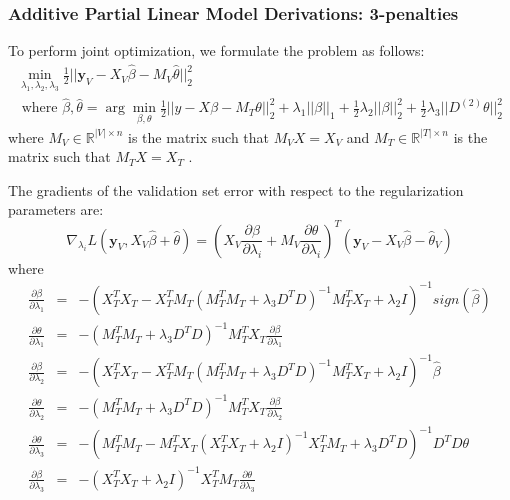 \documentclass[10pt,letterpaper]{article}
\begin{document}
\subsubsection{Additive Partial Linear Model Derivations: 3-penalties}

To perform joint optimization, we formulate the problem as follows:
\begin{multline}
\min_{\lambda_1, \lambda_2, \lambda_3} \frac{1}{2} \bigl\lvert\bigl\lvert \boldsymbol y_V - X_V\hat\beta - M_V \hat\theta \bigl\rvert\bigl\rvert^2_2 \\
\text{ where } \hat\beta, \hat\theta = \arg\min_{\beta, \theta} \frac{1}{2} \bigl\lvert\bigl\lvert y - X\beta - M_T \theta \bigl\rvert\bigl\rvert^2_2
+ \lambda_1 \lvert\lvert \beta \rvert \rvert_1
+ \frac{1}{2} \lambda_2 \lvert\lvert \beta \rvert \rvert_2^2
+ \frac{1}{2} \lambda_3 \lvert\lvert D^{(2)} \theta \rvert \rvert_2^2
\end{multline}
where $M_V \in \mathbb{R}^{|V| \times n}$ is the matrix such that $M_V X = X_V$ and $M_T \in \mathbb{R}^{|T| \times n}$ is the matrix such that $M_T X = X_T$ .

The gradients of the validation set error with respect to the regularization parameters are:
\begin{equation}
\nabla_{\lambda_i} L(\boldsymbol y_V, X_V \hat \beta + \hat \theta) = (X_V \frac{\partial \beta}{\partial \lambda_i} + M_V \frac{\partial \theta}{\partial \lambda_i})^T(\boldsymbol y_V - X_V \hat \beta - \hat \theta_V)
\end{equation}
where
\begin{equation}
\begin{array}{lcl}
\frac{\partial \beta}{\partial \lambda_1} &=& -(X_T^T X_T - X_T^T M_T(M_T^T M_T + \lambda_3 D^TD)^{-1} M_T^T X_T + \lambda_2 I)^{-1} sign(\hat \beta) \\
\frac{\partial \theta}{\partial \lambda_1} &=& -(M_T^T M_T + \lambda_3 D^T D)^{-1}  M_T^T X_T \frac{\partial \beta}{\partial \lambda_1}
\\
\frac{\partial \beta}{\partial \lambda_2} &=& -(X_T^T X_T - X_T^T M_T(M_T^T M_T + \lambda_3 D^TD)^{-1} M_T^T X_T + \lambda_2 I)^{-1} \hat \beta \\
\frac{\partial \theta}{\partial \lambda_2} &=& -(M_T^T M_T + \lambda_3 D^T D)^{-1}  M_T^T X_T \frac{\partial \beta}{\partial \lambda_2}
\\
\frac{\partial \theta}{\partial \lambda_3} &=& -(M_T^T M_T - M_T^T X_T (X_T^TX_T + \lambda_2 I)^{-1} X_T^T M_T + \lambda_3 D^TD)^{-1} D^TD \theta
\\
\frac{\partial \beta}{\partial \lambda_3} &=& - (X_T^TX_T + \lambda_2 I)^{-1} X_T^T M_T \frac{\partial \theta}{\partial \lambda_3} \\
\end{array}
\end{equation}
\end{document}
